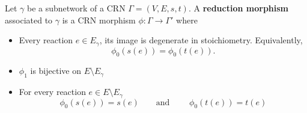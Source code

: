 \documentclass[11pt, one side, article]{memoir}
\newcommand{\define}[1]{\textbf{#1}}
\begin{document}
\begin{definition}
    Let $\gamma$ be a subnetwork of a CRN $\Gamma = (V,E,s,t)$. A \define{reduction morphism} associated to $\gamma$ is a CRN morphism $\phi:\Gamma \to \Gamma'$
    where
    \begin{itemize}
        \item Every reaction $e \in E_\gamma$, its image is degenerate in stoichiometry. Equivalently,
        \[
        \phi_0(s(e))=\phi_0(t(e)).
        \]
        \item $\phi_1$ is bijective on $E \setminus E_\gamma$
        \item For every reaction $e \in E \setminus E_\gamma$
        \[
        \phi_0(s(e)) = s(e) \qquad \textrm{and }\qquad \phi_0(t(e))=t(e)
        \]
    \end{itemize}
\end{definition}
\end{document}

